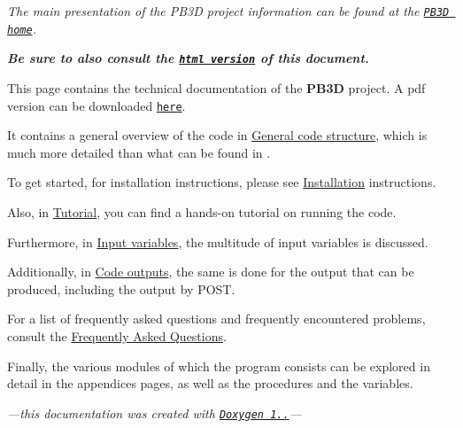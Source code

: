 {\itshape The main presentation of the P\+B3D project information can be found at the \href{https://pb3d.github.io}{\tt P\+B3D home}.}

 
\textit{\textbf{Be sure to also consult the \href{https://pb3d.github.io/Doxygen/html/index.html}{\tt html version} of this document.}}


This page contains the technical documentation of the {\bfseries P\+B3D} project. A pdf version can be downloaded \href{https://pb3d.github.io/PB3D_manual.pdf}{\tt here}.

It contains a general overview of the code in \hyperlink{page_overview}{General code structure}, which is much more detailed than what can be found in \cite{Weyens2017PB3D}.

To get started, for installation instructions, please see \hyperlink{page_installation}{Installation} instructions.

Also, in \hyperlink{page_tutorial}{Tutorial}, you can find a hands-\/on tutorial on running the code.

Furthermore, in \hyperlink{page_inputs}{Input variables}, the multitude of input variables is discussed.

Additionally, in \hyperlink{page_outputs}{Code outputs}, the same is done for the output that can be produced, including the output by P\+O\+ST.

For a list of frequently asked questions and frequently encountered problems, consult the \hyperlink{page_faq}{Frequently Asked Questions}.

  
Finally, the various modules of which the program consists can be explored in detail in the appendices pages, as well as the procedures and the variables.


\begin{center}{\itshape —this documentation was created with \href{http://www.doxygen.org/index.html}{\tt Doxygen 1..}—}\end{center}  